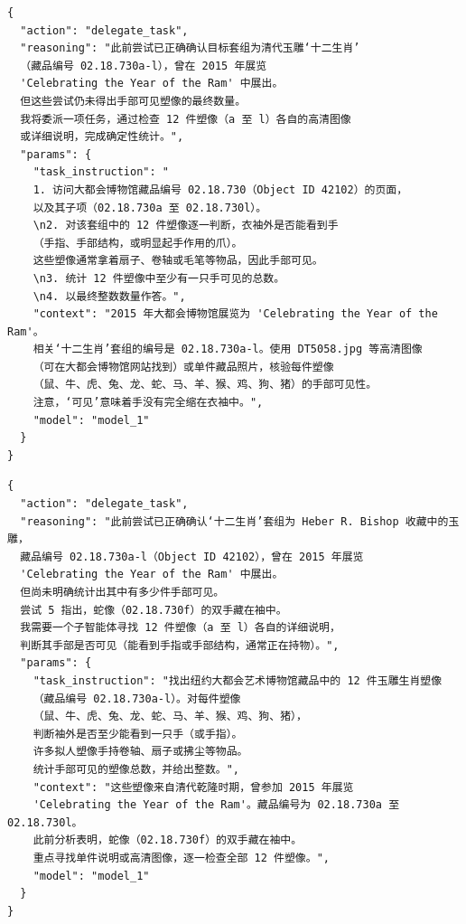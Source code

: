 \begin{tcolorbox}[
  title={\textbf{\small 尝试 5 - 主智能体决策}},
  boxrule=1pt,
  arc=0mm,
  colback=gray!5,
  colframe=gray!70,
  breakable,
  before skip=10pt,
  after skip=10pt,
  pad at break=2mm,
  parbox=false
]
\begin{verbatim}
{
  "action": "delegate_task",
  "reasoning": "此前尝试已正确确认目标套组为清代玉雕‘十二生肖’
  （藏品编号 02.18.730a-l），曾在 2015 年展览
  'Celebrating the Year of the Ram' 中展出。
  但这些尝试仍未得出手部可见塑像的最终数量。
  我将委派一项任务，通过检查 12 件塑像（a 至 l）各自的高清图像
  或详细说明，完成确定性统计。",
  "params": {
    "task_instruction": "
    1. 访问大都会博物馆藏品编号 02.18.730（Object ID 42102）的页面，
    以及其子项（02.18.730a 至 02.18.730l）。
    \n2. 对该套组中的 12 件塑像逐一判断，衣袖外是否能看到手
    （手指、手部结构，或明显起手作用的爪）。
    这些塑像通常拿着扇子、卷轴或毛笔等物品，因此手部可见。
    \n3. 统计 12 件塑像中至少有一只手可见的总数。
    \n4. 以最终整数数量作答。",
    "context": "2015 年大都会博物馆展览为 'Celebrating the Year of the Ram'。
    相关‘十二生肖’套组的编号是 02.18.730a-l。使用 DT5058.jpg 等高清图像
    （可在大都会博物馆网站找到）或单件藏品照片，核验每件塑像
    （鼠、牛、虎、兔、龙、蛇、马、羊、猴、鸡、狗、猪）的手部可见性。
    注意，‘可见’意味着手没有完全缩在衣袖中。",
    "model": "model_1"
  }
}
\end{verbatim}
\end{tcolorbox}

\begin{tcolorbox}[
  title={\textbf{\small 尝试 6 - 主智能体决策}},
  boxrule=1pt,
  arc=0mm,
  colback=gray!5,
  colframe=gray!70,
  breakable,
  before skip=10pt,
  after skip=10pt,
  pad at break=2mm,
  parbox=false
]
\begin{verbatim}
{
  "action": "delegate_task",
  "reasoning": "此前尝试已正确确认‘十二生肖’套组为 Heber R. Bishop 收藏中的玉雕，
  藏品编号 02.18.730a-l（Object ID 42102），曾在 2015 年展览
  'Celebrating the Year of the Ram' 中展出。
  但尚未明确统计出其中有多少件手部可见。
  尝试 5 指出，蛇像（02.18.730f）的双手藏在袖中。
  我需要一个子智能体寻找 12 件塑像（a 至 l）各自的详细说明，
  判断其手部是否可见（能看到手指或手部结构，通常正在持物）。",
  "params": {
    "task_instruction": "找出纽约大都会艺术博物馆藏品中的 12 件玉雕生肖塑像
    （藏品编号 02.18.730a-l）。对每件塑像
    （鼠、牛、虎、兔、龙、蛇、马、羊、猴、鸡、狗、猪），
    判断袖外是否至少能看到一只手（或手指）。
    许多拟人塑像手持卷轴、扇子或拂尘等物品。
    统计手部可见的塑像总数，并给出整数。",
    "context": "这些塑像来自清代乾隆时期，曾参加 2015 年展览
    'Celebrating the Year of the Ram'。藏品编号为 02.18.730a 至 02.18.730l。
    此前分析表明，蛇像（02.18.730f）的双手藏在袖中。
    重点寻找单件说明或高清图像，逐一检查全部 12 件塑像。",
    "model": "model_1"
  }
}
\end{verbatim}
\end{tcolorbox}

